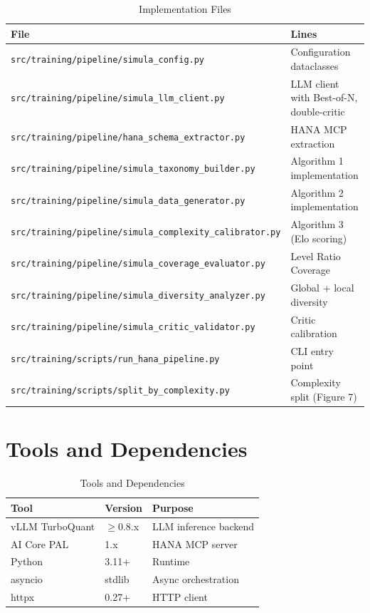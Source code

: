 \begin{table}[H]
\centering
\caption{Implementation Files}
\begin{tabularx}{\textwidth}{lX}
\toprule
\textbf{File} & \textbf{Lines} \\
\midrule
\texttt{src/training/pipeline/simula\_config.py} & Configuration dataclasses \\
\texttt{src/training/pipeline/simula\_llm\_client.py} & LLM client with Best-of-N, double-critic \\
\texttt{src/training/pipeline/hana\_schema\_extractor.py} & HANA MCP extraction \\
\texttt{src/training/pipeline/simula\_taxonomy\_builder.py} & Algorithm 1 implementation \\
\texttt{src/training/pipeline/simula\_data\_generator.py} & Algorithm 2 implementation \\
\texttt{src/training/pipeline/simula\_complexity\_calibrator.py} & Algorithm 3 (Elo scoring) \\
\texttt{src/training/pipeline/simula\_coverage\_evaluator.py} & Level Ratio Coverage \\
\texttt{src/training/pipeline/simula\_diversity\_analyzer.py} & Global + local diversity \\
\texttt{src/training/pipeline/simula\_critic\_validator.py} & Critic calibration \\
\texttt{src/training/scripts/run\_hana\_pipeline.py} & CLI entry point \\
\texttt{src/training/scripts/split\_by\_complexity.py} & Complexity split (Figure 7) \\
\bottomrule
\end{tabularx}
\end{table}

\section{Tools and Dependencies}

\begin{table}[H]
\centering
\caption{Tools and Dependencies}
\begin{tabular}{lll}
\toprule
\textbf{Tool} & \textbf{Version} & \textbf{Purpose} \\
\midrule
vLLM TurboQuant & $\geq$0.8.x & LLM inference backend \\
AI Core PAL & 1.x & HANA MCP server \\
Python & 3.11+ & Runtime \\
asyncio & stdlib & Async orchestration \\
httpx & 0.27+ & HTTP client \\
\bottomrule
\end{tabular}
\end{table}

